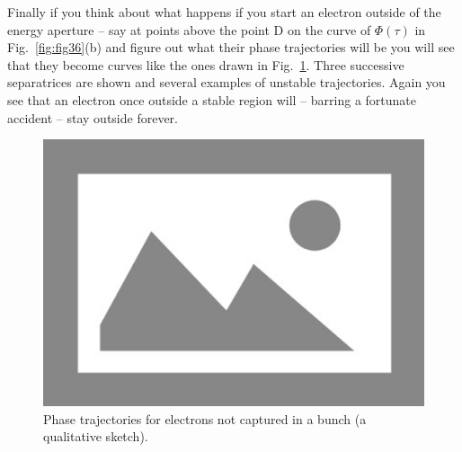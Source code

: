 Finally if you think about what happens if you start an electron outside of the energy aperture
 -- say at points above the point D on the curve of $\Phi(\tau)$ in Fig.~\ref{fig:fig36}(b)
and figure out what their phase trajectories will be you will see that they become curves like the ones drawn in Fig.~\ref{fig:fig39}. Three successive separatrices are shown and several examples of unstable trajectories. Again you see that an electron once outside a stable region will -- barring a fortunate accident -- stay outside forever.

\begin{figure}[!htb]
	\centering
	\includegraphics[width=0.8\linewidth]{./Figuras/placeholder.png}
	\caption{Phase trajectories for electrons not captured in a bunch (a qualitative sketch).}
	\label{fig:fig39}
\end{figure}


